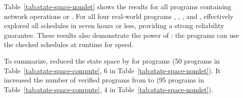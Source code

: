 Table~\ref{tab:state-space-nondet} shows the results for all
\nprognondetandnetwork programs containing network operations or
\nondets.  For all four real-world programs \pfscan, \partition,
\nthelement, and \partialsort, \ecosys effectively explored all
schedules in seven hours or less, providing a strong reliability
guarantee.  These results also demonstrate the power of \parrot:
the programs can use the checked schedules at runtime for speed.

To summarize, \parrot reduced the state space by \shrinkscale for
\nprogshrink programs (50 programs in Table~\ref{tab:state-space-compute},
6 in Table~\ref{tab:state-space-nondet}).  It increased the number of
verified programs from \nprogverifieddbug to \nprogverifiedxxx (95
programs in Table~\ref{tab:state-space-compute}, 4 in
Table~\ref{tab:state-space-nondet}).





